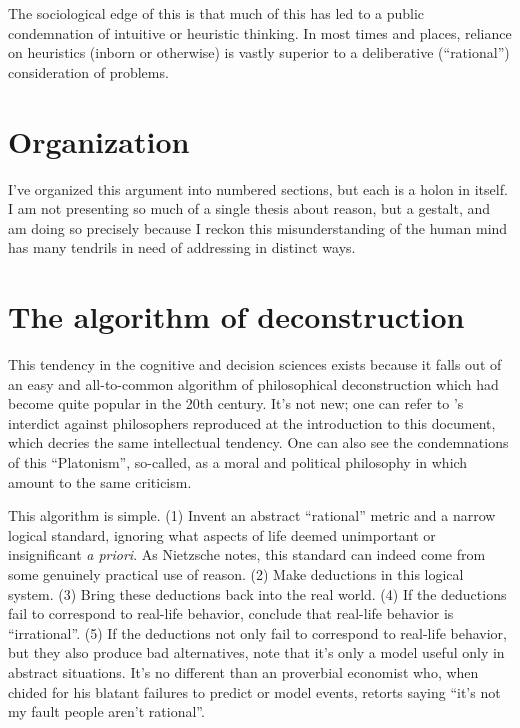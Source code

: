 \documentclass{article}
\begin{document}
The sociological edge of this is that much of this has led to a public condemnation of intuitive or heuristic thinking.
In most times and places, reliance on heuristics (inborn or otherwise) is vastly superior to a deliberative (``rational'') consideration of problems.


\section{Organization}

I've organized this argument into numbered sections, but each is a holon in itself.
I am not presenting so much of a single thesis about reason, but a gestalt, and am doing so precisely because I reckon this misunderstanding of the human mind has many tendrils in need of addressing in distinct ways.

\section{The algorithm of deconstruction}

This tendency in the cognitive and decision sciences exists because it falls out of an easy and all-to-common algorithm of philosophical deconstruction which had become quite popular in the 20th century.
It's not new; one can refer to \textcite{nietzsche88}'s interdict against philosophers reproduced at the introduction to this document, which decries the same intellectual tendency.
One can also see the condemnations of this ``Platonism'', so-called, as a moral and political philosophy in \textcite{popper45} which amount to the same criticism.

This algorithm is simple.
(1) Invent an abstract ``rational'' metric and a narrow logical standard, ignoring what aspects of life deemed unimportant or insignificant \textit{a priori}.
As Nietzsche notes, this standard can indeed come from some genuinely practical use of reason.
(2) Make deductions in this logical system.
(3) Bring these deductions back into the real world.
(4) If the deductions fail to correspond to real-life behavior, conclude that real-life behavior is ``irrational''.
(5) If the deductions not only fail to correspond to real-life behavior, but they also produce bad alternatives, note that it's only a model useful only in abstract situations.
It's no different than an proverbial economist who, when chided for his blatant failures to predict or model events, retorts saying ``it's not my fault people aren't rational''.
\end{document}
